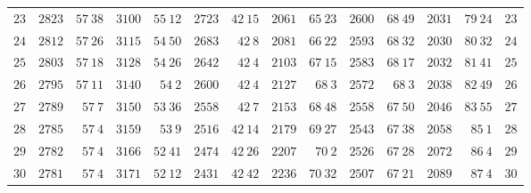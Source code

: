 \begin{GaussVICeresFrame}{.92}
{\begin{tabular}{r@{\GaussVICeresRule}r|r@{\GaussVICeresRule}r|r@{\GaussVICeresRule}r|r@{\GaussVICeresRule}r|r@{\GaussVICeresRule}r|r@{\GaussVICeresRule}r|r@{\GaussVICeresRule}r}
$23$ & $2823$ & $57\ 38$ & $3100$ & $55\ 12$ & $2723$ & $42\ 15$ & $2061$ & $65\ 23$ & $2600$ & $68\ 49$ & $2031$ & $79\ 24$ & $23$ \\
$24$ & $2812$ & $57\ 26$ & $3115$ & $54\ 50$ & $2683$ & $42\ 8$ & $2081$ & $66\ 22$ & $2593$ & $68\ 32$ & $2030$ & $80\ 32$ & $24$ \\
$25$ & $2803$ & $57\ 18$ & $3128$ & $54\ 26$ & $2642$ & $42\ 4$ & $2103$ & $67\ 15$ & $2583$ & $68\ 17$ & $2032$ & $81\ 41$ & $25$ \\[3pt]
$26$ & $2795$ & $57\ 11$ & $3140$ & $54\ 2$ & $2600$ & $42\ 4$ & $2127$ & $68\ 3$ & $2572$ & $68\ 3$ & $2038$ & $82\ 49$ & $26$ \\
$27$ & $2789$ & $57\ 7$ & $3150$ & $53\ 36$ & $2558$ & $42\ 7$ & $2153$ & $68\ 48$ & $2558$ & $67\ 50$ & $2046$ & $83\ 55$ & $27$ \\
$28$ & $2785$ & $57\ 4$ & $3159$ & $53\ 9$ & $2516$ & $42\ 14$ & $2179$ & $69\ 27$ & $2543$ & $67\ 38$ & $2058$ & $85\ 1$ & $28$ \\
$29$ & $2782$ & $57\ 4$ & $3166$ & $52\ 41$ & $2474$ & $42\ 26$ & $2207$ & $70\ 2$ & $2526$ & $67\ 28$ & $2072$ & $86\ 4$ & $29$ \\
$30$ & $2781$ & $57\ 4$ & $3171$ & $52\ 12$ & $2431$ & $42\ 42$ & $2236$ & $70\ 32$ & $2507$ & $67\ 21$ & $2089$ & $87\ 4$ & $30$ \\
\end{tabular}\par}
\end{GaussVICeresFrame}

